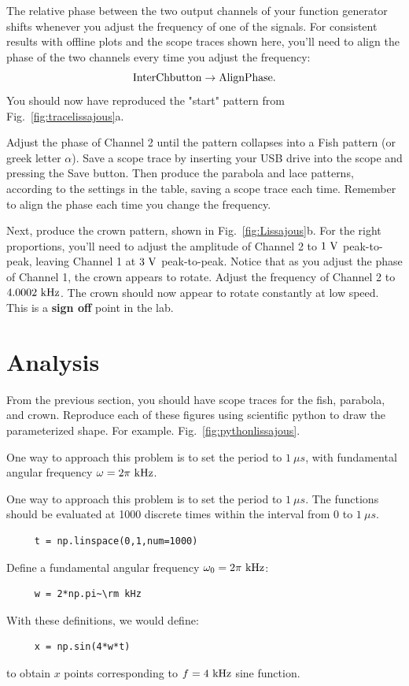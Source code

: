 The relative phase between the two output channels of your function generator shifts whenever you adjust the frequency of one of the signals.  For consistent results with offline plots and the scope traces shown here, you'll need to align the phase of the two channels every time you adjust the frequency:
\begin{displaymath}
\rm Inter Ch button \to AlignPhase.
\end{displaymath}
You should now have reproduced the "start" pattern from Fig.~\ref{fig:tracelissajous}a.

Adjust the phase of Channel 2 until the pattern collapses into a Fish pattern (or greek letter $\alpha$).
Save a scope trace by inserting your USB drive into the scope and pressing the Save button.  Then produce the parabola and lace patterns, according to the settings in the table, saving a scope trace each time.  Remember to align the phase each time you change the frequency.

Next, produce the crown pattern, shown in Fig.~\ref{fig:Lissajous}b.   For the right proportions, you'll need to adjust the amplitude of Channel 2 to $1~\rm V$ peak-to-peak, leaving Channel 1 at $3~\rm V$ peak-to-peak.  Notice that as you adjust the phase of Channel 1, the crown appears to rotate.  Adjust the frequency of Channel 2 to $4.0002~\rm kHz$.  The crown should now appear to rotate constantly at low speed.   This is a {\bf sign off} point in the lab.

\section{Analysis}

From the previous section, you should have scope traces for the fish, parabola, and crown.  Reproduce each of these figures using scientific python to draw the parameterized shape.  For example. Fig.~\ref{fig:pythonlissajous}.

One way to approach this problem is to set the period to $1~\mu s$, with fundamental angular frequency $\omega = 2 \pi~\rm kHz$.  

One way to approach this problem is to set the period to $1~\mu s$.  The functions should be evaluated at 1000 discrete times within the interval from 0 to $1~\mu s$.
\begin{verbatim}
     t = np.linspace(0,1,num=1000)
\end{verbatim}
Define a fundamental angular frequency $\omega_0 = 2 \pi~\rm kHz$:
\begin{verbatim}
     w = 2*np.pi~\rm kHz
\end{verbatim}
With these definitions, we would define:
\begin{verbatim}
     x = np.sin(4*w*t)
\end{verbatim}
to obtain $x$ points corresponding to $f=4~\rm kHz$ sine function.

